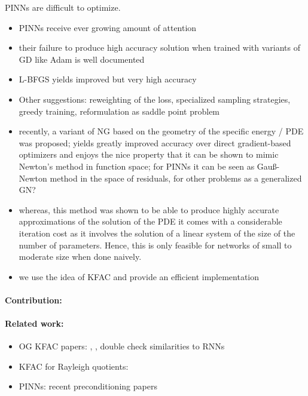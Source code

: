 PINNs are difficult to optimize.
\begin{itemize}
    \item PINNs receive ever growing amount of attention
    \item their failure to produce high accuracy solution when trained with variants of GD like Adam is well documented
    \item L-BFGS yields improved but very high accuracy
    \item Other suggestions: reweighting of the loss, specialized sampling strategies, greedy training, reformulation as saddle point problem
    \item recently, a variant of NG based on the geometry of the specific energy / PDE was proposed; yields greatly improved accuracy over direct gradient-based optimizers and enjoys the nice property that it can be shown to mimic Newton's method in function space; for PINNs it can be seen as Gau\ss-Newton method in the space of residuals, for other problems as a generalized GN?
    \item whereas, this method was shown to be able to produce highly accurate approximations of the solution of the PDE it comes with a considerable iteration cost as it involves the solution of a linear system of the size of the number of parameters. Hence, this is only feasible for networks of small to moderate size when done naively.
    \item we use the idea of KFAC and provide an efficient implementation
\end{itemize}

\paragraph{Contribution:} 

\paragraph{Related work:}
\begin{itemize}
\item OG KFAC papers: \cite{martens2015optimizing}, \cite{martens2018kroneckerfactored}, double check similarities to RNNs
\item KFAC for Rayleigh quotients:
\item PINNs: recent preconditioning papers
\end{itemize}

